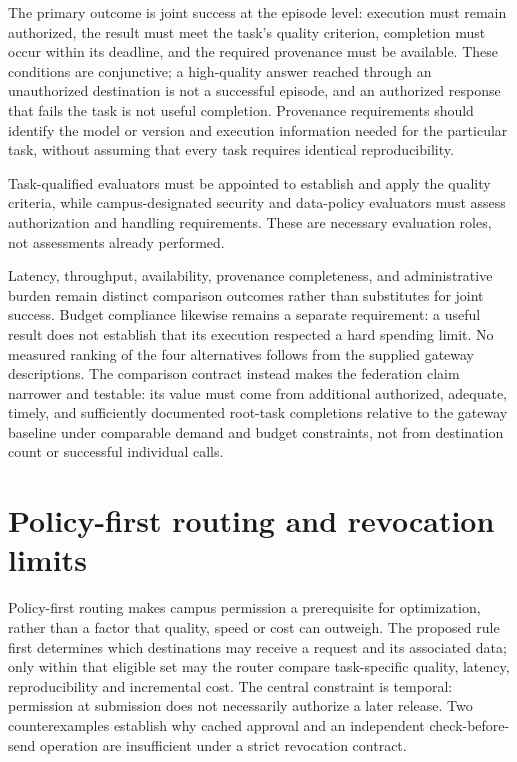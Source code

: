 \documentclass[11pt]{article}
\begin{document}
The primary outcome is joint success at the episode level: execution must remain authorized, the result must meet the task\textquoteright{}s quality criterion, completion must occur within its deadline, and the required provenance must be available. These conditions are conjunctive; a high-quality answer reached through an unauthorized destination is not a successful episode, and an authorized response that fails the task is not useful completion. Provenance requirements should identify the model or version and execution information needed for the particular task, without assuming that every task requires identical reproducibility.

Task-qualified evaluators must be appointed to establish and apply the quality criteria, while campus-designated security and data-policy evaluators must assess authorization and handling requirements. These are necessary evaluation roles, not assessments already performed.

Latency, throughput, availability, provenance completeness, and administrative burden remain distinct comparison outcomes rather than substitutes for joint success. Budget compliance likewise remains a separate requirement: a useful result does not establish that its execution respected a hard spending limit. No measured ranking of the four alternatives follows from the supplied gateway descriptions. The comparison contract instead makes the federation claim narrower and testable: its value must come from additional authorized, adequate, timely, and sufficiently documented root-task completions relative to the gateway baseline under comparable demand and budget constraints, not from destination count or successful individual calls.

\section{Policy-first routing and revocation limits}
Policy-first routing makes campus permission a prerequisite for optimization, rather than a factor that quality, speed or cost can outweigh. The proposed rule first determines which destinations may receive a request and its associated data; only within that eligible set may the router compare task-specific quality, latency, reproducibility and incremental cost. The central constraint is temporal: permission at submission does not necessarily authorize a later release. Two counterexamples establish why cached approval and an independent check-before-send operation are insufficient under a strict revocation contract.
\end{document}
